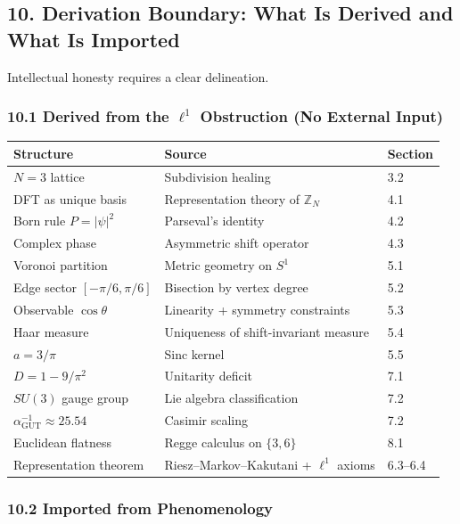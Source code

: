 \documentclass[
]{article}
\begin{document}
\hypertarget{derivation-boundary-what-is-derived-and-what-is-imported}{%
\subsection{10. Derivation Boundary: What Is Derived and What Is
Imported}\label{derivation-boundary-what-is-derived-and-what-is-imported}}

Intellectual honesty requires a clear delineation.

\hypertarget{derived-from-the-ell1-obstruction-no-external-input}{%
\subsubsection{\texorpdfstring{10.1 Derived from the \(\ell^1\)
Obstruction (No External
Input)}{10.1 Derived from the \textbackslash ell\^{}1 Obstruction (No External Input)}}\label{derived-from-the-ell1-obstruction-no-external-input}}

\begin{longtable}[]{@{}lll@{}}
\toprule
Structure & Source & Section\tabularnewline
\midrule
\endhead
\(N = 3\) lattice & Subdivision healing & 3.2\tabularnewline
DFT as unique basis & Representation theory of \(\mathbb{Z}_N\) &
4.1\tabularnewline
Born rule \(P = |\psi|^2\) & Parseval's identity & 4.2\tabularnewline
Complex phase & Asymmetric shift operator & 4.3\tabularnewline
Voronoi partition & Metric geometry on \(S^1\) & 5.1\tabularnewline
Edge sector \([-\pi/6, \pi/6]\) & Bisection by vertex degree &
5.2\tabularnewline
Observable \(\cos\theta\) & Linearity + symmetry constraints &
5.3\tabularnewline
Haar measure & Uniqueness of shift-invariant measure &
5.4\tabularnewline
\(a = 3/\pi\) & Sinc kernel & 5.5\tabularnewline
\(D = 1 - 9/\pi^2\) & Unitarity deficit & 7.1\tabularnewline
\(SU(3)\) gauge group & Lie algebra classification & 7.2\tabularnewline
\(\alpha_{\mathrm{GUT}}^{-1} \approx 25.54\) & Casimir scaling &
7.2\tabularnewline
Euclidean flatness & Regge calculus on \(\{3,6\}\) & 8.1\tabularnewline
Representation theorem & Riesz--Markov--Kakutani + \(\ell^1\) axioms &
6.3--6.4\tabularnewline
\bottomrule
\end{longtable}

\hypertarget{imported-from-phenomenology}{%
\subsubsection{10.2 Imported from
Phenomenology}\label{imported-from-phenomenology}}
\end{document}
